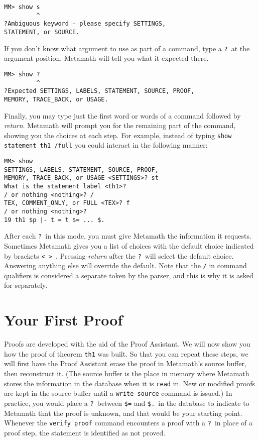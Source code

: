 \begin{verbatim}
MM> show s
         ^
?Ambiguous keyword - please specify SETTINGS,
STATEMENT, or SOURCE.
\end{verbatim}

If you don't know what argument to use as part of a command, type a
\texttt{?}\index{\texttt{]}@\texttt{?}\ in command lines}\ at the
argument position.  Metamath will tell you what it expected there.

\begin{verbatim}
MM> show ?
         ^
?Expected SETTINGS, LABELS, STATEMENT, SOURCE, PROOF,
MEMORY, TRACE_BACK, or USAGE.
\end{verbatim}

Finally, you may type just the first word or words of a command followed
by {\em return}.  Metamath will prompt you for the remaining part of the
command, showing you the choices at each step.  For example, instead of
typing \texttt{show statement th1 /full} you could interact in the
following manner:
\begin{verbatim}
MM> show
SETTINGS, LABELS, STATEMENT, SOURCE, PROOF,
MEMORY, TRACE_BACK, or USAGE <SETTINGS>? st
What is the statement label <th1>?
/ or nothing <nothing>? /
TEX, COMMENT_ONLY, or FULL <TEX>? f
/ or nothing <nothing>?
19 th1 $p |- t = t $= ... $.
\end{verbatim}
After each \texttt{?}\ in this mode, you must give Metamath the
information it requests.  Sometimes Metamath gives you a list of choices
with the default choice indicated by brackets \texttt{< > }. Pressing
{\em return} after the \texttt{?}\ will select the default choice.
Answering anything else will override the default.  Note that the
\texttt{/} in command qualifiers is considered a separate
token by the parser, and this is why it is asked for
separately.

\section{Your First Proof}\label{frstprf}

Proofs are developed with the aid of the Proof Assistant.  We will now show you how the proof of theorem \texttt{th1}
was built.  So that you can repeat these steps, we will first have the
Proof Assistant erase the proof in Metamath's source buffer, then reconstruct it.  (The source buffer is the place in memory
where Metamath stores the information in the database when it is
\texttt{read} in.  New or modified proofs
are kept in the source buffer until a \texttt{write source}
command is issued.)  In practice, you
would place a \texttt{?}\index{\texttt{]}@\texttt{?}\ inside proofs}\
between \texttt{\$=} and
\texttt{\$.}\ in the database to indicate
to Metamath\index{Metamath} that the proof is unknown, and that would be
your starting point.  Whenever the \texttt{verify proof} command encounters
a proof with a \texttt{?}\ in place of a proof step, the statement is
identified as not proved.

